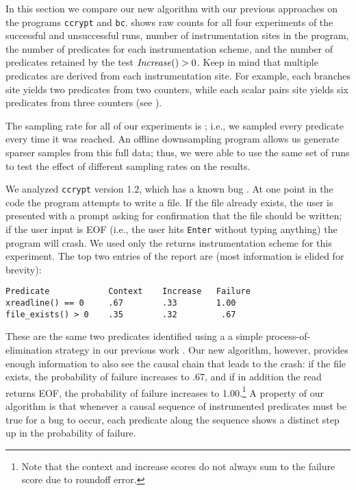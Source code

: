 


In this section we compare our new algorithm with our previous
approaches on the programs {\tt ccrypt} and {\tt bc}.
 shows raw counts for all four experiments of the
successful and unsuccessful runs, number of instrumentation sites in
the program, the number of predicates for each
instrumentation scheme, and the number of predicates retained by the
test $\mbox{\textit{Increase}}() > 0$.   Keep in mind that multiple predicates are
derived from each instrumentation site.  For example, each branches
site yields two predicates from two counters, while each scalar pairs
site yields six predicates from three counters (see ).

The sampling rate for all of our experiments is ;
i.e., we sampled every predicate every time it was reached.  An
offline downsampling program allows us generate sparser samples from this
full data; thus, we were able to use the same set of runs to test the
effect of different sampling rates on the results.  

We analyzed {\tt ccrypt} version 1.2, which has a known bug \cite{Selinger:2003:cqual}.  At one point in the code the program attempts to write a file.  If the file already exists, the user is presented with a prompt asking for confirmation that the file should be written; if the user input is EOF (i.e., the user hits {\tt Enter} without typing anything) the program will crash.  We used only the returns
instrumentation scheme for this experiment. The top
two entries of the report are (most information is elided for
brevity):
\begin{verbatim}
Predicate            Context    Increase   Failure
xreadline() == 0     .67        .33        1.00
file_exists() > 0    .35        .32         .67
\end{verbatim}

These are the same two predicates identified using a a simple process-of-elimination strategy in our previous work
\cite{PLDI`03*141}.  Our new algorithm, however, provides enough information to also see the causal chain that
leads to the crash: if the file exists, the probability of failure increases to .67, and if in addition the
read returns EOF, the probability of failure increases to 1.00.\footnote{Note that the context and increase scores do not always sum to the failure score due to roundoff error.}   A property of our algorithm is that 
whenever a causal sequence of instrumented predicates must be true for a bug to occur, each predicate along the
sequence shows a distinct step up in the probability of failure.

